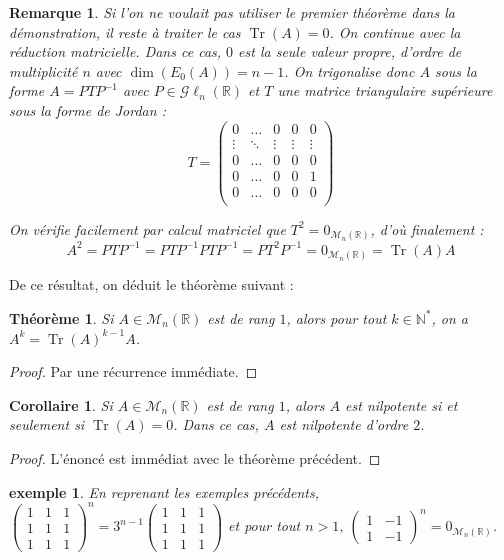 \documentclass[a4paper]{article}
\newtheorem*{theorem}{Théorème}
\newtheorem*{remark}{Remarque}
\newtheorem*{example}{exemple}
\newtheorem*{cor}{Corollaire}
\begin{document}
\begin{remark}
    Si l'on ne voulait pas utiliser le premier théorème dans la démonstration, il reste à traiter le cas $\operatorname{Tr}(A) = 0$. On continue avec la réduction matricielle. Dans ce cas, $0$ est la seule valeur propre, d'ordre de multiplicité $n$ avec $\dim(E_0(A))=n-1$. On trigonalise donc $A$ sous la forme $A = PTP^{-1}$ avec $P \in \mathcal{G}\ell_n(\mathbb{R})$ et $T$ une matrice triangulaire supérieure sous la forme de Jordan :
    $$ T = \begin{pmatrix}
        0 & \dots & 0 & 0 & 0 \\
        \vdots  & \ddots & \vdots & \vdots & \vdots \\
        0 & \dots & 0 & 0 & 0 \\
        0 & \dots & 0 & 0 & 1 \\
        0 & \dots & 0 & 0 & 0 \\
    \end{pmatrix}$$
    
    On vérifie facilement par calcul matriciel que $T^2 = 0_{\mathcal{M}_{n}(\mathbb{R})}$, d'où finalement : $$A^2 = PTP^{-1} = PTP^{-1}PTP^{-1} = PT^2P^{-1} = 0_{\mathcal{M}_{n}(\mathbb{R})} = \operatorname{Tr}(A)A$$
\end{remark}

De ce résultat, on déduit le théorème suivant :

\begin{theorem}
    Si $A \in \mathcal{M}_{n}(\mathbb{R})$ est de rang $1$, alors pour tout $k \in \mathbb{N}^*$, on a $A^k = \operatorname{Tr}(A)^{k-1}A$.
\end{theorem}

\begin{proof}
    Par une récurrence immédiate.
\end{proof}

\begin{cor}
    Si $A \in \mathcal{M}_{n}(\mathbb{R})$ est de rang $1$, alors $A$ est nilpotente si et seulement si $\operatorname{Tr}(A) = 0$. Dans ce cas, $A$ est nilpotente d'ordre $2$.
\end{cor}

\begin{proof}
    L'énoncé est immédiat avec le théorème précédent.
\end{proof}

\begin{example}
    En reprenant les exemples précédents, $\begin{pmatrix} 1 & 1 & 1 \\ 1 & 1 & 1 \\ 1 & 1 & 1 \end{pmatrix} ^n = 3^{n-1} \begin{pmatrix} 1 & 1 & 1 \\ 1 & 1 & 1 \\ 1 & 1 & 1 \end{pmatrix}$ et pour tout $n > 1$, $\begin{pmatrix}1 & -1 \\ 1 & -1\end{pmatrix}^n = 0_{\mathcal{M}_{n}(\mathbb{R})}$.
\end{example}
\end{document}
